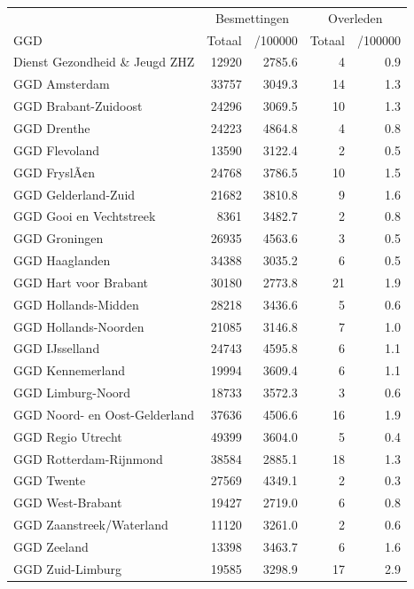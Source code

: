 \documentclass[
  english,
  man,floatsintext]{apa6}
\begin{document}
\begin{table}
\centering\begingroup\fontsize{10}{12}\selectfont

\begin{threeparttable}
\begin{tabular}{lrrrr}
\toprule
\multicolumn{1}{c}{ } & \multicolumn{2}{c}{Besmettingen} & \multicolumn{2}{c}{Overleden} \\
\cmidrule(l{3pt}r{3pt}){2-3} \cmidrule(l{3pt}r{3pt}){4-5}
GGD & Totaal & /100000 & Totaal & /100000\\
\midrule
Dienst Gezondheid \& Jeugd ZHZ & 12920 & 2785.6 & 4 & 0.9\\
GGD Amsterdam & 33757 & 3049.3 & 14 & 1.3\\
GGD Brabant-Zuidoost & 24296 & 3069.5 & 10 & 1.3\\
GGD Drenthe & 24223 & 4864.8 & 4 & 0.8\\
GGD Flevoland & 13590 & 3122.4 & 2 & 0.5\\
GGD FryslÃ¢n & 24768 & 3786.5 & 10 & 1.5\\
GGD Gelderland-Zuid & 21682 & 3810.8 & 9 & 1.6\\
GGD Gooi en Vechtstreek & 8361 & 3482.7 & 2 & 0.8\\
GGD Groningen & 26935 & 4563.6 & 3 & 0.5\\
GGD Haaglanden & 34388 & 3035.2 & 6 & 0.5\\
GGD Hart voor Brabant & 30180 & 2773.8 & 21 & 1.9\\
GGD Hollands-Midden & 28218 & 3436.6 & 5 & 0.6\\
GGD Hollands-Noorden & 21085 & 3146.8 & 7 & 1.0\\
GGD IJsselland & 24743 & 4595.8 & 6 & 1.1\\
GGD Kennemerland & 19994 & 3609.4 & 6 & 1.1\\
GGD Limburg-Noord & 18733 & 3572.3 & 3 & 0.6\\
GGD Noord- en Oost-Gelderland & 37636 & 4506.6 & 16 & 1.9\\
GGD Regio Utrecht & 49399 & 3604.0 & 5 & 0.4\\
GGD Rotterdam-Rijnmond & 38584 & 2885.1 & 18 & 1.3\\
GGD Twente & 27569 & 4349.1 & 2 & 0.3\\
GGD West-Brabant & 19427 & 2719.0 & 6 & 0.8\\
GGD Zaanstreek/Waterland & 11120 & 3261.0 & 2 & 0.6\\
GGD Zeeland & 13398 & 3463.7 & 6 & 1.6\\
GGD Zuid-Limburg & 19585 & 3298.9 & 17 & 2.9\\

\end{tabular}
\end{threeparttable}
\end{table}
\end{document}
